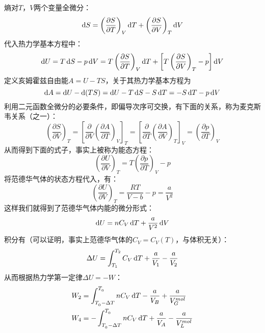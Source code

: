 \begin{solution}
{        熵对$T$，$V$两个变量全微分：
        \begin{equation*}
            \dif S = \left(\frac{\partial S}{\partial T}\right)_{V} \dif T + \left(\frac{\partial S}{\partial V}\right)_{T} \dif V
        \end{equation*}
        代入热力学基本方程中：
        \begin{equation*}
            \dif U = T\dif S - p \dif V
            = T\left(\frac{\partial S}{\partial T}\right)_{V} \dif T + \left[T\left(\frac{\partial S}{\partial V}\right)_{T} - p\right] \dif V
        \end{equation*}
        定义亥姆霍兹自由能$A=U-TS$，关于其热力学基本方程为
        \begin{equation*}
            \dif{A} = \dif U - \dif (TS) = \dif U - T \dif S - S \dif T = -S\dif{T} - p\dif{V}
        \end{equation*}
        利用二元函数全微分的必要条件，即偏导次序可交换，有下面的关系，称为麦克斯韦关系（之一）：
        \begin{equation*}
            \left(\frac{\partial S}{\partial V}\right)_{T}
            =\left[\frac{\partial}{\partial V}\left(\frac{\partial A}{\partial T}\right)_V \right]_T
            =\left[\frac{\partial}{\partial T}\left(\frac{\partial A}{\partial V}\right)_T \right]_V
            =\left(\frac{\partial p}{\partial T}\right)_{V}
        \end{equation*}
        从而得到下面的式子，事实上被称为能态方程：
        \begin{equation*}
            \left(\frac{\partial U}{\partial V}\right)_{T} = T\left(\frac{\partial p}{\partial T}\right)_{V} - p
        \end{equation*}
        将范德华气体的状态方程代入，有：
        \begin{equation*}
            \left(\frac{\partial U}{\partial V}\right)_{T} = \frac{RT}{V-b} - p = \frac{a}{V^{2}}
        \end{equation*}
        这样我们就得到了范德华气体内能的微分形式：
        \begin{equation*}
            \dif U = nC_{V}\dif T + \frac{a}{V^{2}}\dif V
        \end{equation*}
        积分有（可以证明，事实上范德华气体的$C_{V} = C_{V}(T)$，与体积无关）：
        \begin{equation*}
            \Delta U = \int_{T_1}^{T_2}C_{V}\dif T + \frac{a}{V_1} - \frac{a}{V_2}
        \end{equation*}
        从而根据热力学第一定律$\Delta U = -W$：
        \begin{equation*}
            \begin{aligned}
                 & W_2 = \int_{T_{_0}-\Delta T}^{T_{_0}}nC_{V}\dif T - \frac{a}{V_{B}} + \frac{a}{V_{G}^{mol}}  \\
                 & W_4 = -\int_{T_{_0}-\Delta T}^{T_{_0}}nC_{V}\dif T + \frac{a}{V_{A}} - \frac{a}{V_{L}^{mol}}
            \end{aligned}
        \end{equation*}

}
\end{solution}
